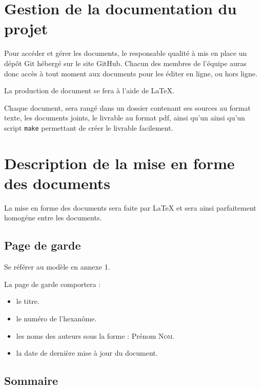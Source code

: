 \section{Gestion de la documentation du projet}

Pour accéder et gérer les documents, le responsable qualité à mis en place un dépôt Git hébergé sur le site GitHub.
Chacun des membres de l’équipe auras donc accès à tout moment aux documents pour les éditer en ligne, ou hors ligne.

La production de document se fera à l’aide de LaTeX.

Chaque document, sera rangé dans un dossier contenant ses sources au format texte, les documents joints, le livrable au format pdf, ainsi qu'un  ainsi qu'un script \texttt{make} permettant de créer le livrable facilement.

\section{Description de la mise en forme des documents}




La mise en forme des documents sera faite par LaTeX et sera ainsi parfaitement homogéne entre les documents.


\subsection{Page de garde}
   Se référer au modèle en annexe 1.

   La page de garde comportera :
   \begin{itemize}
      \item le titre.
      \item le numéro de l'hexanôme.
      \item les noms des auteurs sous la forme : Prénom \textsc{Nom}.
      \item la date de dernière mise à jour du document.
   \end{itemize}

\subsection{Sommaire}
  
